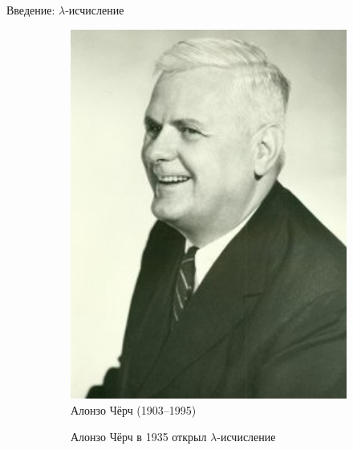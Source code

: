 

\newcommand{\tb}[1]{\textcolor{blue}{#1}}
\newcommand{\tr}[1]{\textcolor{red}{#1}}



\begin{frame}{Введение: $\lambda$-исчисление}
  \begin{figure}
    \centering
    \begin{subfigure}[t]{0.45\textwidth}
      \begin{minipage}{0.7\textwidth}
      \includegraphics[width=1\textwidth]{220px-Alonzo_Church.jpg}\\
            Алонзо Чёрч (1903--1995)
      \end{minipage}
    \end{subfigure}
    \begin{subfigure}[t]{0.45\textwidth}
      \vspace{-5em}   %
  Алонзо Чёрч в 1935   открыл $\lambda$-исчисление
\vspace{1em}


\end{subfigure}
\end{figure}
\end{frame}
